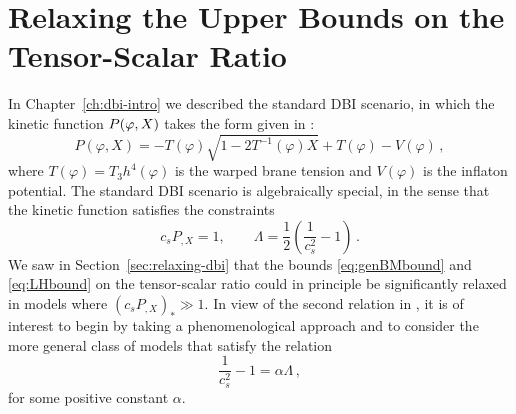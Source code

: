 \section{Relaxing the Upper Bounds on the Tensor-Scalar Ratio}
\label{sec:relaxing-multi}
% 
In Chapter~\ref{ch:dbi-intro} we described the standard DBI scenario, in
which the kinetic function $P(\varphi, X)$ takes the form given in
:
%  
\begin{equation}
\label{eq:DBIkinetic}
P (\varphi , X) = -T(\varphi ) \sqrt{1-2T^{-1}(\varphi ) X} + T(\varphi ) - V(\varphi ) \,,
\end{equation}
% 
where $T(\varphi ) = T_3 h^4 (\varphi )$ 
is the warped brane tension and  $V(\varphi )$ is the 
inflaton potential. The standard DBI scenario is
algebraically special, 
in the sense that the kinetic function satisfies the constraints 
% 
\begin{equation}
\label{eq:cspx1}
c_s P_{,X} = 1 , \qquad  \Lambda = \frac{1}{2} \left( 
\frac{1}{c_s^2} -1 \right) \,.
\end{equation}
% 
We saw in Section~\ref{sec:relaxing-dbi} that the 
bounds \eqref{eq:genBMbound} and \eqref{eq:LHbound} 
on the tensor-scalar ratio could in principle be 
significantly relaxed in models where $(c_sP_{,X})_* \gg 1$. 
In view of the second relation in , it is of interest 
to begin by taking a phenomenological approach and to consider the more  
general class of models that satisfy the relation
%  
\begin{equation}
\label{eq:defalpha}
\frac{1}{c_s^2} -1 = \alpha \Lambda \,,
\end{equation}
% 
for some positive constant $\alpha$. 

